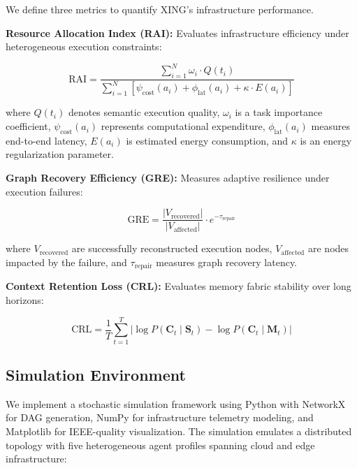 \documentclass[conference]{IEEEtran}
\begin{document}
We define three metrics to quantify XING's infrastructure performance.

\textbf{Resource Allocation Index (RAI):} Evaluates infrastructure efficiency under heterogeneous execution constraints:

\begin{equation}
    \text{RAI} = \frac{\sum_{i=1}^{N} \omega_i \cdot Q(t_i)}{\sum_{i=1}^{N} [\psi_{\mathrm{cost}}(a_i) + \phi_{\mathrm{lat}}(a_i) + \kappa \cdot E(a_i)]}
    \label{eq:rai}
\end{equation}

where $Q(t_i)$ denotes semantic execution quality, $\omega_i$ is a task importance coefficient, $\psi_{\mathrm{cost}}(a_i)$ represents computational expenditure, $\phi_{\mathrm{lat}}(a_i)$ measures end-to-end latency, $E(a_i)$ is estimated energy consumption, and $\kappa$ is an energy regularization parameter.

\textbf{Graph Recovery Efficiency (GRE):} Measures adaptive resilience under execution failures:

\begin{equation}
    \text{GRE} = \frac{|V_{\mathrm{recovered}}|}{|V_{\mathrm{affected}}|} \cdot e^{-\tau_{\mathrm{repair}}}
    \label{eq:gre}
\end{equation}

where $V_{\mathrm{recovered}}$ are successfully reconstructed execution nodes, $V_{\mathrm{affected}}$ are nodes impacted by the failure, and $\tau_{\mathrm{repair}}$ measures graph recovery latency.

\textbf{Context Retention Loss (CRL):} Evaluates memory fabric stability over long horizons:

\begin{equation}
    \text{CRL} = \frac{1}{T} \sum_{t=1}^{T} \left| \log P(\mathbf{C}_t \mid \mathbf{S}_t) - \log P(\mathbf{C}_t \mid \mathbf{M}_t) \right|
    \label{eq:crl}
\end{equation}

\subsection{Simulation Environment}

We implement a stochastic simulation framework using Python with NetworkX for DAG generation, NumPy for infrastructure telemetry modeling, and Matplotlib for IEEE-quality visualization. The simulation emulates a distributed topology with five heterogeneous agent profiles spanning cloud and edge infrastructure:
\end{document}
